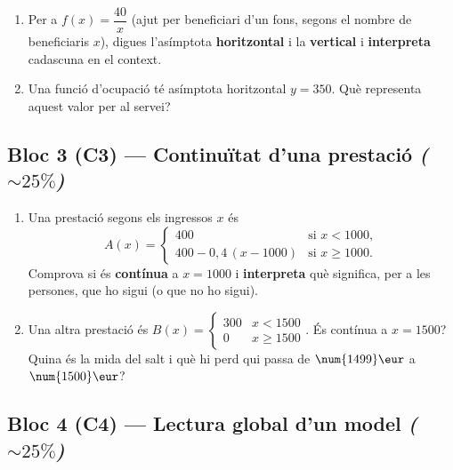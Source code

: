 \begin{enumerate}[label=\textbf{\arabic*.}, leftmargin=2em, itemsep=7pt, start=2]
  \item Per a $f(x)=\dfrac{40}{x}$ (ajut per beneficiari d'un fons, segons el nombre de
        beneficiaris $x$), digues l'asímptota \textbf{horitzontal} i la \textbf{vertical}
        i \textbf{interpreta} cadascuna en el context.
  \item Una funció d'ocupació té asímptota horitzontal $y=350$. Què representa aquest
        valor per al servei?
\end{enumerate}

\subsection*{Bloc 3 (C3) — Continuïtat d'una prestació \hfill \normalfont\itshape ($\sim 25\%$)}

\begin{enumerate}[label=\textbf{\arabic*.}, leftmargin=2em, itemsep=7pt, start=4]
  \item Una prestació segons els ingressos $x$ és
        \[
        A(x)=
        \begin{cases}
        400 & \text{si } x<\num{1000},\\[2pt]
        400-0,4\,(x-\num{1000}) & \text{si } x\ge \num{1000}.
        \end{cases}
        \]
        Comprova si és \textbf{contínua} a $x=\num{1000}$ i \textbf{interpreta} què
        significa, per a les persones, que ho sigui (o que no ho sigui).
  \item Una altra prestació és
        $B(x)=\begin{cases}300 & x<\num{1500}\\ 0 & x\ge\num{1500}\end{cases}$.
        És contínua a $x=\num{1500}$? Quina és la mida del salt i què hi perd qui passa
        de $\num{1499}\eur$ a $\num{1500}\eur$?
\end{enumerate}

\subsection*{Bloc 4 (C4) — Lectura global d'un model \hfill \normalfont\itshape ($\sim 25\%$)}

